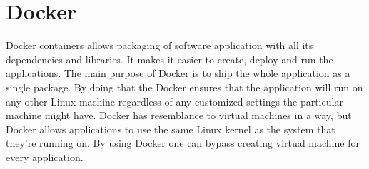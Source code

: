 \chapter*{Docker}

Docker containers allows packaging of software application with all its dependencies and libraries. It makes it easier to create, deploy and run the applications. The main purpose of Docker is to ship the whole application as a single package. 
By doing that the Docker ensures that the application will run on any other Linux machine regardless of any customized settings the particular machine might have.
Docker has resemblance to virtual machines in a way, but Docker allows applications to use the same Linux kernel as the system that they’re running on. By using Docker one can bypass creating virtual machine for every application. 


 
